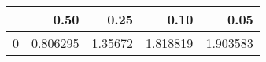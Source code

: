 \begin{tabular}{lrrrr}
\toprule
{} &      0.50 &     0.25 &      0.10 &      0.05 \\
\midrule
0 &  0.806295 &  1.35672 &  1.818819 &  1.903583 \\
\bottomrule
\end{tabular}
